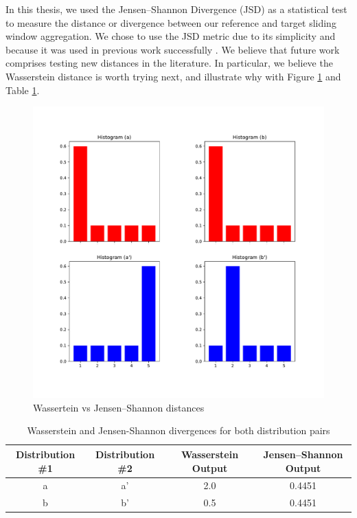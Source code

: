 In this thesis, we used the Jensen–Shannon Divergence (JSD) as a statistical test to measure the distance or divergence between our reference and target sliding window aggregation. We chose to use the JSD metric due to its simplicity and because it was used in previous work successfully \cite{SAMM}. We believe that future work comprises testing new distances in the literature. In particular, we believe the Wasserstein distance is worth trying next, and illustrate why with Figure \ref{fig:wasserteinvsjsd} and Table \ref{tbl:wassertein-vs-jsd}. 
\begin{figure}[!htb]
    \begin{center}
      \includegraphics[scale=0.55]{figures/wasserstein-vs-jsd.pdf}
      \caption{Wassertein vs Jensen–Shannon distances}
      \label{fig:wasserteinvsjsd}
    \end{center}
\end{figure}
\begin{table}[!htb]
    \begin{center}
        \begin{tabular}{|c|c|c|c|}
        \hline
        \textbf{Distribution \#1} & \textbf{Distribution \#2} & \textbf{Wasserstein Output} & \textbf{Jensen–Shannon Output} \\ \hline
        a                         & a'                        & 2.0                         & 0.4451                         \\ \hline
        b                         & b'                        & 0.5                         & 0.4451                         \\ \hline
        \end{tabular}
    \end{center}
    \caption[Wasserstein and Jensen-Shannon divergences output comparison]{Wasserstein and Jensen-Shannon divergences for both distribution pairs}
    \label{tbl:wassertein-vs-jsd}
\end{table}
